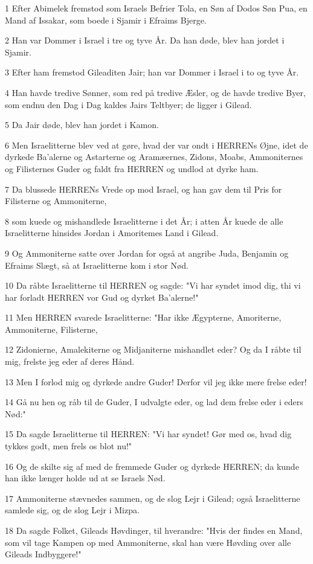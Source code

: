 \par 1 Efter Abimelek fremstod som Israels Befrier Tola, en Søn af Dodos Søn Pua, en Mand af Issakar, som boede i Sjamir i Efraims Bjerge.
\par 2 Han var Dommer i Israel i tre og tyve År. Da han døde, blev han jordet i Sjamir.
\par 3 Efter ham fremstod Gileaditen Jair; han var Dommer i Israel i to og tyve År.
\par 4 Han havde tredive Sønner, som red på tredive Æsler, og de havde tredive Byer, som endnu den Dag i Dag kaldes Jairs Teltbyer; de ligger i Gilead.
\par 5 Da Jair døde, blev han jordet i Kamon.
\par 6 Men Israelitterne blev ved at gøre, hvad der var ondt i HERRENs Øjne, idet de dyrkede Ba'alerne og Astarterne og Aramæernes, Zidons, Moabs, Ammoniternes og Filisternes Guder og faldt fra HERREN og undlod at dyrke ham.
\par 7 Da blussede HERRENs Vrede op mod Israel, og han gav dem til Pris for Filisterne og Ammoniterne,
\par 8 som kuede og mishandlede Israelitterne i det År; i atten År kuede de alle Israelitterne hinsides Jordan i Amoritemes Land i Gilead.
\par 9 Og Ammoniterne satte over Jordan for også at angribe Juda, Benjamin og Efraims Slægt, så at Israelitterne kom i stor Nød.
\par 10 Da råbte Israelitterne til HERREN og sagde: "Vi har syndet imod dig, thi vi har forladt HERREN vor Gud og dyrket Ba'alerne!"
\par 11 Men HERREN svarede Israelitterne: "Har ikke Ægypterne, Amoriterne, Ammoniterne, Filisterne,
\par 12 Zidonierne, Amalekiterne og Midjaniterne mishandlet eder? Og da I råbte til mig, frelste jeg eder af deres Hånd.
\par 13 Men I forlod mig og dyrkede andre Guder! Derfor vil jeg ikke mere frelse eder!
\par 14 Gå nu hen og råb til de Guder, I udvalgte eder, og lad dem frelse eder i eders Nød:"
\par 15 Da sagde Israelitterne til HERREN: "Vi har syndet! Gør med os, hvad dig tykkes godt, men frels os blot nu!"
\par 16 Og de skilte sig af med de fremmede Guder og dyrkede HERREN; da kunde han ikke længer holde ud at se Israels Nød.
\par 17 Ammoniterne stævnedes sammen, og de slog Lejr i Gilead; også Israelitterne samlede sig, og de slog Lejr i Mizpa.
\par 18 Da sagde Folket, Gileads Høvdinger, til hverandre: "Hvis der findes en Mand, som vil tage Kampen op med Ammoniterne, skal han være Høvding over alle Gileads Indbyggere!"

